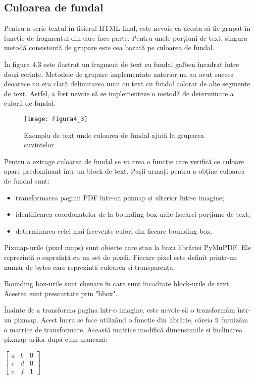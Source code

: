 \subsection{Culoarea de fundal}

Pentru a scrie textul în fișierul HTML final, este nevoie ca acesta să fie grupat în funcție de fragmentul din care face parte. Pentru unele porțiuni de text, singura metodă consistentă de grupare este cea bazată pe culoarea de fundal.

\vspace{3em}

În figura 4.3 este ilustrat un fragment de text cu fundal galben încadrat între două cerințe. Metodele de grupare implementate anterior nu au avut succes deoarece nu era clară delimitarea unui cu text cu fundal colorat de alte segmente de text. Astfel, a fost nevoie să se implementeze o metodă de determinare a culorii de fundal.
\begin{figure}[H]
	\centering
	\texttt{[image: Figura4\_3]}
	\caption{Exemplu de text unde culoarea de fundal ajută la gruparea cuvintelor}
	\label{fig:Figura4_3}
\end{figure}

Pentru a extrage culoarea de fundal se va crea o funcție care verifică ce culoare apare predominant într-un block de text. Pașii urmați pentru a obține culoarea de fundal sunt:

\begin{itemize}
	\item transformarea paginii PDF într-un pixmap și ulterior într-o imagine;
	\item identificarea coordonatelor de la bounding box-urile fiecărei porțiune de text;
	\item determinarea celei mai frecvente culori din fiecare bounding box.
\end{itemize}

Pixmap-urile (pixel maps) sunt obiecte care stau la baza librăriei PyMuPDF. Ele reprezintă o suprafață cu un set de pixeli. Fiecare pixel este definit printr-un număr de bytes care reprezintă culoarea și transparența.

Bounding box-urile sunt chenare în care sunt încadrate block-urile de text. Acestea sunt prescurtate prin "bbox".

Înainte de a transforma pagina într-o imagine, este nevoie să o transformăm într-un pixmap. Acest lucru se face utilizând o funcție din librărie, căreia îi furnizăm o matrice de transformare. Această matrice modifică dimensiunile și înclinarea pixmap-urilor după cum urmează:
\begin{center}
	$\begin{bmatrix}
		a & b & 0\\
		c & d & 0\\
		e & f & 1
	\end{bmatrix}$
\end{center}

